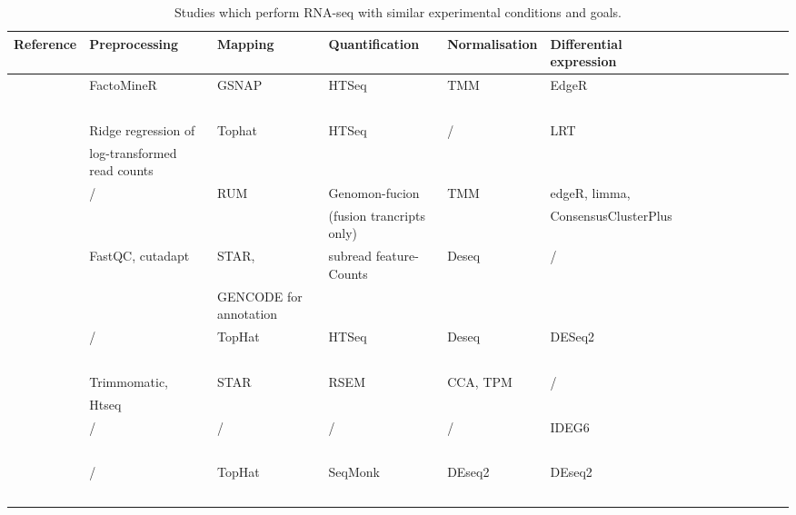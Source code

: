 \begin{landscape}
	\pagestyle{empty}
\begin{table}[h]
	\footnotesize
    \centering
    \captionsetup{font=footnotesize}
    \caption{Studies which perform RNA-seq with similar experimental conditions and goals.}
	\label{tab:rnaseq_experiments}
    \begin{tabular}{llllllllllllll}
		\toprule
		\textbf{Reference} & \textbf{Preprocessing} & \textbf{Mapping} & \textbf{Quantification} & \textbf{Normalisation} & \textbf{Differential expression}  \\ \midrule
        \cite{cardoso2019gene} & FactoMineR & GSNAP & HTSeq & TMM &  EdgeR  \\
        ~ & ~ & ~ & ~ & ~ &   \\ \hline
        \cite{mostafavi2014type} & Ridge regression of  & Tophat & HTSeq & / & LRT  \\
        ~ & log-transformed read counts & ~ & ~ & ~ &   \\ \hline
        \cite{shiozawa2017gene} & / & RUM & Genomon-fucion  & TMM & edgeR, limma,   \\
        ~ & ~ & ~ & (fusion trancripts only) & ~ & ConsensusClusterPlus  \\ \hline
        \cite{schubert2018perturbation} & FastQC, cutadapt & STAR,  & subread feature-Counts & Deseq & /  \\
        ~ & ~ & GENCODE for annotation & ~ & ~ &   \\ \hline
        \cite{schmiedel2018impact} & / & TopHat & HTSeq & Deseq & DESeq2  \\
        ~ & ~ & ~ & ~ & ~ &   \\ \hline
        \cite{lee2020lineage} &  Trimmomatic,  & STAR & RSEM  & CCA, TPM & /  \\
        ~ & Htseq & ~ & ~ & ~ &   \\ \hline
        \cite{wang2013dynamic} & / & / & / & / & IDEG6  \\
        ~ & ~ & ~ & ~ & ~ &   \\ \hline
        \cite{gatt2021tyrosol} & / & TopHat & SeqMonk & DEseq2 & DEseq2  \\ 
        ~ & ~ & ~ & ~ & ~ &   \\ \bottomrule
    \end{tabular}
\end{table}
\end{landscape}

